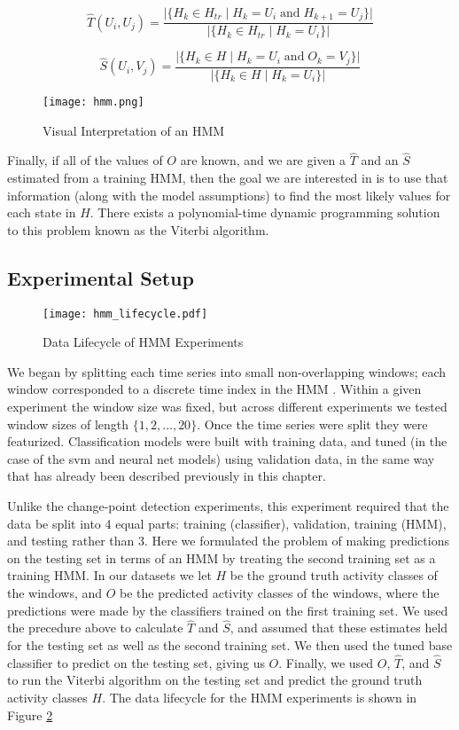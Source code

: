 \[
\hat{T}(U_i,U_j) = \frac{|\{H_k \in H_{tr} \; | \; H_k=U_i \; \text{and} \; H_{k+1}=U_j\}|} {|\{H_k \in H_{tr} \; | \; H_k=U_i\}|}
\]

\[
\hat{S}(U_i,V_j) = \frac{|\{H_k \in H \; | \; H_k=U_i \; \text{and} \; O_k=V_j\}|} {|\{H_k \in H \; | \; H_k=U_i\}|}
\]

\begin{figure}
 \centering
 \texttt{[image: hmm.png]}
 \caption{Visual Interpretation of an HMM}
 \label{fig:hmm}
\end{figure}

Finally, if all of the values of $O$ are known, and we are given
a $\hat{T}$ and an $\hat{S}$ estimated from a training HMM, then the goal we are interested in
is to use that information (along with the model assumptions)
to find the most likely values for each state in $H$. There
exists a polynomial-time dynamic programming solution to this problem known as
the Viterbi algorithm. \cite{russell10}

\subsection{Experimental Setup}

\begin{figure}
 \centering
 \texttt{[image: hmm\_lifecycle.pdf]}
 \caption{Data Lifecycle of HMM Experiments}
 \label{fig:hmm_lifecycle}
\end{figure}

We began by splitting each time series into small non-overlapping windows;
each window corresponded to a discrete time index in the HMM . Within a
given experiment the window size was fixed, but across different experiments we
tested window sizes of length $\{1,2, \ldots ,20\}$. Once the time series were
split they were featurized. Classification models were built with training data,
and tuned (in the case of the svm and neural net models) using validation data,
in the same way that has already been described previously in this chapter.

Unlike the change-point detection experiments, this experiment required
that the data be split into 4 equal parts: training (classifier), validation,
training (HMM), and testing rather than 3. 
Here we formulated the problem of making predictions on the testing set in terms
of an HMM by treating the second training set as a training HMM. In our datasets
we let $H$ be the ground truth activity classes of the windows, and $O$ be the
predicted activity classes of the windows, where the predictions were made by
the classifiers trained on the first training set. We used the precedure above
to calculate $\hat{T}$ and $\hat{S}$, and assumed that these estimates held for
the testing set as well as the second training set. We then used the
tuned base classifier to predict on the testing set, giving us $O$. Finally,
we used $O$, $\hat{T}$, and $\hat{S}$ to run the Viterbi algorithm on the
testing set and predict the ground truth activity classes $H$. The data
lifecycle for the HMM experiments is shown in Figure \ref{fig:hmm_lifecycle} 
